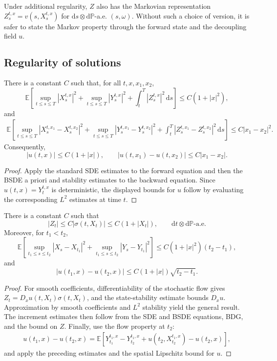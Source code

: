 \begin{remark}
Under additional regularity, $Z$ also has the Markovian representation
$Z_s^{t,x}=v(s,X_s^{t,x})$ for
$\mathrm ds\otimes\mathrm d\mathbb P$-a.e. $(s,\omega)$.  Without such a
choice of version, it is safer to state the Markov property through the
forward state and the decoupling field $u$.
\end{remark}

\subsection{Regularity of solutions}

\begin{thm}
There is a constant $C$ such that, for all $t,x,x_1,x_2$,
\[
  \mathbb E\!\left[
    \sup_{t\le s\le T}|X_s^{t,x}|^2
    +\sup_{t\le s\le T}|Y_s^{t,x}|^2
    +\int_t^T|Z_s^{t,x}|^2\,\mathrm ds
  \right]
  \le C(1+|x|^2),
\]
and
\[
\begin{aligned}
  \mathbb E\!\left[
    \sup_{t\le s\le T}|X_s^{t,x_1}-X_s^{t,x_2}|^2
    +\sup_{t\le s\le T}|Y_s^{t,x_1}-Y_s^{t,x_2}|^2
    +\int_t^T|Z_s^{t,x_1}-Z_s^{t,x_2}|^2\,\mathrm ds
  \right]
  \le C|x_1-x_2|^2.
\end{aligned}
\]
Consequently,
\[
  |u(t,x)|\le C(1+|x|),
  \qquad
  |u(t,x_1)-u(t,x_2)|\le C|x_1-x_2|.
\]
\end{thm}

\begin{proof}
Apply the standard SDE estimates to the forward equation and then the
BSDE a priori and stability estimates to the backward equation.  Since
$u(t,x)=Y_t^{t,x}$ is deterministic, the displayed bounds for $u$ follow
by evaluating the corresponding $L^2$ estimates at time $t$.
\end{proof}

\begin{thm}
There is a constant $C$ such that
\[
  |Z_t|\le C|\sigma(t,X_t)|\le C(1+|X_t|),
  \qquad \mathrm dt\otimes\mathrm d\mathbb P\text{-a.e.}
\]
Moreover, for $t_1<t_2$,
\[
  \mathbb E\!\left[
    \sup_{t_1\le s\le t_2}|X_s-X_{t_1}|^2
    +\sup_{t_1\le s\le t_2}|Y_s-Y_{t_1}|^2
  \right]
  \le C(1+|x|^2)(t_2-t_1),
\]
and
\[
  |u(t_1,x)-u(t_2,x)|
  \le C(1+|x|)\sqrt{t_2-t_1}.
\]
\end{thm}

\begin{proof}
For smooth coefficients, differentiability of the stochastic flow gives
$Z_t=D_xu(t,X_t)\sigma(t,X_t)$, and the state-stability estimate bounds
$D_xu$.  Approximation by smooth coefficients and $L^2$ stability yield
the general result.  The increment estimates then follow from the SDE
and BSDE equations, BDG, and the bound on $Z$.  Finally, use the flow
property at $t_2$:
\[
\begin{aligned}
  u(t_1,x)-u(t_2,x)
  =\mathbb E\!\left[
    Y_{t_1}^{t_1,x}-Y_{t_2}^{t_1,x}
    +u(t_2,X_{t_2}^{t_1,x})-u(t_2,x)
  \right],
\end{aligned}
\]
and apply the preceding estimates and the spatial Lipschitz bound for
$u$.
\end{proof}

